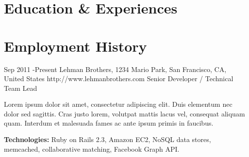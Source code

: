 \documentclass[10pt]{article} %
\begin{document}

\section{Education \& Experiences}




\section{Employment History}

\job
{Sep 2011 -}{Present}
{Lehman Brothers, 1234 Mario Park, San Francisco, CA, United States}
{http://www.lehmanbrothers.com}
{Senior Developer / Technical Team Lead}
{Lorem ipsum dolor sit amet, consectetur adipiscing elit. Duis elementum nec dolor sed sagittis. Cras justo lorem, volutpat mattis lacus vel, consequat aliquam quam. Interdum et malesuada fames ac ante ipsum primis in faucibus.\\
\rule{0mm}{5mm}\textbf{Technologies:} Ruby on Rails 2.3, Amazon EC2, NoSQL data stores, memcached, collaborative matching, Facebook Graph API.}
\end{document}

